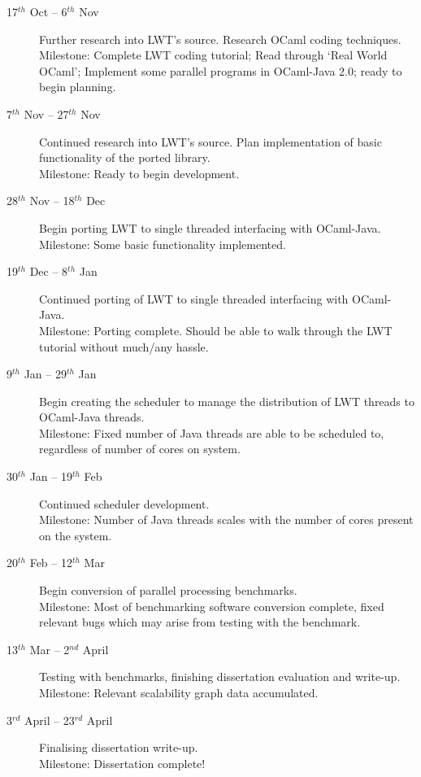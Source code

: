 \begin{description}
\item[17$^{th}$ Oct -- 6$^{th}$ Nov] Further research into LWT's source. Research OCaml coding techniques.\\
Milestone: Complete LWT coding tutorial; Read through `Real World OCaml'; Implement some parallel programs in OCaml-Java 2.0; ready to begin planning.

\item[7$^{th}$ Nov -- 27$^{th}$ Nov]
Continued research into LWT's source. Plan implementation of basic functionality of the ported library.\\
Milestone: Ready to begin development.

\item[28$^{th}$ Nov -- 18$^{th}$ Dec] Begin porting LWT to single threaded interfacing with OCaml-Java.\\
Milestone: Some basic functionality implemented.

\item[19$^{th}$ Dec -- 8$^{th}$ Jan] Continued porting of LWT to single threaded interfacing with OCaml-Java.\\
Milestone: Porting complete. Should be able to walk through the LWT tutorial without much/any hassle.

\item[9$^{th}$ Jan -- 29$^{th}$ Jan] Begin creating the scheduler to manage the distribution of LWT threads to OCaml-Java threads.\\
Milestone: Fixed number of Java threads are able to be scheduled to, regardless of number of cores on system.

\item[30$^{th}$ Jan -- 19$^{th}$ Feb] Continued scheduler development.\\
Milestone: Number of Java threads scales with the number of cores present on the system.

\item[20$^{th}$ Feb -- 12$^{th}$ Mar] Begin conversion of parallel processing benchmarks.\\
Milestone: Most of benchmarking software conversion complete, fixed relevant bugs which may arise from testing with the benchmark.

\item[13$^{th}$ Mar -- 2$^{nd}$ April] Testing with benchmarks, finishing dissertation evaluation and write-up.\\
Milestone: Relevant scalability graph data accumulated.

\item[3$^{rd}$ April -- 23$^{rd}$ April] Finalising dissertation write-up.\\
Milestone: Dissertation complete!

\end{description}

